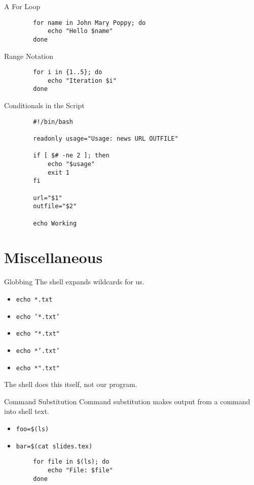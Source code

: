 \documentclass[pdf,usenames,dvipsnames,14pt]{beamer}%
\begin{document}
\begin{frame}[fragile]{A For Loop}
	\begin{verbatim}
		for name in John Mary Poppy; do
		    echo "Hello $name"
		done
	\end{verbatim}
\end{frame}

\begin{frame}[fragile]{Range Notation}
	\begin{verbatim}
		for i in {1..5}; do
		    echo "Iteration $i"
		done
	\end{verbatim}
\end{frame}

\begin{frame}[fragile]{Conditionals in the Script}
	\begin{verbatim}
		#!/bin/bash
		
		readonly usage="Usage: news URL OUTFILE"
		
		if [ $# -ne 2 ]; then
		    echo "$usage"
		    exit 1
		fi
		
		url="$1"
		outfile="$2"
		
		echo Working
	\end{verbatim}
\end{frame}

\section{Miscellaneous}

\begin{frame}{Globbing}
	The shell expands wildcards for us.
	\begin{itemize}
		\item \texttt{echo *.txt}
		\item \texttt{echo '*.txt'}
		\item \texttt{echo "*.txt"}
		\item \texttt{echo *'.txt'}
		\item \texttt{echo *".txt"}
	\end{itemize}
	The shell does this itself, not our program.
\end{frame}

\begin{frame}[fragile]{Command Substitution}
	Command substitution makes output from a command into shell text.
	\begin{itemize}
		\item \texttt{foo=\$(ls)}
		\item \texttt{bar=\$(cat slides.tex)}
	\end{itemize}
	\begin{verbatim}
		for file in $(ls); do
		    echo "File: $file"
		done
	\end{verbatim}
\end{frame}
\end{document}
